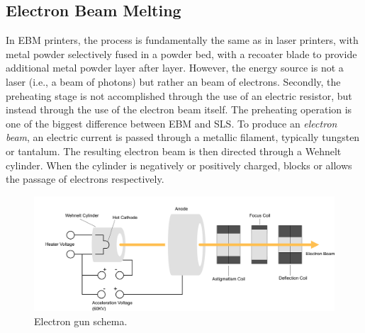 \subsection{Electron Beam Melting}
\label{subsec:ebm}
In EBM printers, the process is fundamentally the same as in laser printers, with metal powder selectively fused in a powder bed, with a recoater blade to provide additional metal powder layer after layer. However, the energy source is not a laser (i.e., a beam of photons) but rather an beam of electrons. Secondly, the preheating stage is not accomplished through the use of an electric resistor, but instead through the use of the electron beam itself. The preheating operation is one of the biggest difference between EBM and SLS. To produce an \emph{electron beam}, an electric current is passed through a metallic filament, typically tungsten or tantalum. The resulting electron beam is then directed through a Wehnelt cylinder. When the cylinder is negatively or positively charged, blocks or allows the passage of electrons respectively.
\begin{figure}
    \centering
    \includegraphics[scale=0.5]{Images/EBM.png}
    \caption[Electron gun schema.]{Electron gun schema.}
    \label{fig:electrongun}
\end{figure}
